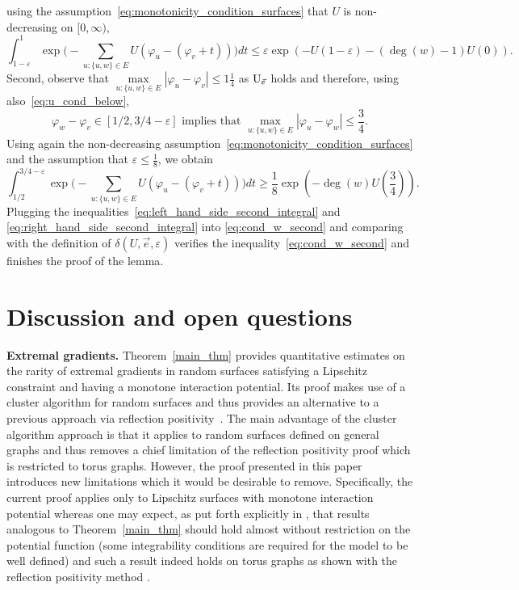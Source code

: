 \documentclass[english]{article}
\newcommand{\UL}{\textup{U}}
\theoremstyle{plain}
\theoremstyle{plain}
\begin{document}
using the assumption~\eqref{eq:monotonicity_condition_surfaces} that $U$ is non-decreasing on $[0,\infty)$,
\begin{equation}\label{eq:left_hand_side_second_integral}
  \int_{1-\varepsilon}^{1} \exp\bigg(-\sum_{u:\{u,w\}\in E} U(\varphi_u - (\varphi_v+t))\bigg)dt \le
  \varepsilon \exp(-U(1-\varepsilon)-(\deg(w)-1)U(0)).
\end{equation}
Second, observe that $\max\limits_{u:\{u,w\}\in E}|\varphi_u-\varphi_v|\leq 1\frac{1}{4}
$ as $\UL_{\vec{e}}$ holds and therefore, using also~\eqref{eq:u_cond_below},
\[
\varphi_w -\varphi_v\in \left[1/2, 3/4-\varepsilon\right] \text{ implies that }\max\limits_{u:\{u,w\}\in E}|\varphi_u-\varphi_w|\le \frac{3}{4} .
\]
Using again the non-decreasing assumption~\eqref{eq:monotonicity_condition_surfaces} and the assumption that $\varepsilon \le \frac{1}{8}$, we obtain
\begin{equation}\label{eq:right_hand_side_second_integral}
\int_{1/2}^{3/4-\varepsilon} \exp\bigg(-\sum_{u:\{u,w\}\in E} U(\varphi_u -
  (\varphi_v+t))\bigg)dt\ge
  \frac{1}{8}\exp\left(-\deg(w)U\left(\frac{3}{4}\right)\right).
\end{equation}
Plugging the inequalities~\eqref{eq:left_hand_side_second_integral} and \eqref{eq:right_hand_side_second_integral} into \eqref{eq:cond_w_second} and comparing with the definition of $\delta(U,\vec{e},\varepsilon)$ verifies the inequality~\eqref{eq:cond_w_second} and finishes the proof of the lemma.



\section{Discussion and open questions}\label{sec:discussion_and_open_questions}
{\bf Extremal gradients.} Theorem~\ref{main_thm} provides quantitative estimates on the rarity of extremal gradients in random surfaces satisfying a Lipschitz constraint and having a monotone interaction potential. Its proof makes use of a cluster algorithm for random surfaces and thus provides an alternative to a previous approach via reflection positivity~\cite[Theorem~3.2]{milos2015delocalization}. The main advantage of the cluster algorithm approach is that it applies to random surfaces defined on general graphs and thus removes a chief limitation of the reflection positivity proof which is restricted to torus graphs. However, the proof presented in this paper introduces new limitations which it would be desirable to remove. Specifically, the current proof applies only to Lipschitz surfaces with monotone interaction potential whereas one may expect, as put forth explicitly in \cite[Section 6]{milos2015delocalization}, that results analogous to Theorem~\ref{main_thm} should hold almost without restriction on the potential function (some integrability conditions are required for the model to be well defined) and such a result indeed holds on torus graphs as shown with the reflection positivity method \cite[Theorem~3.2]{milos2015delocalization}.
\end{document}
